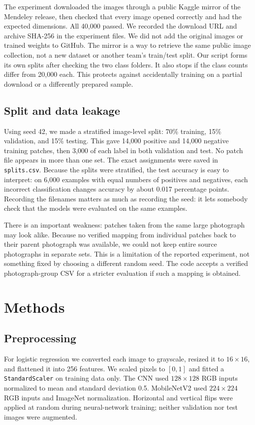 \documentclass[conference,letterpaper]{IEEEtran}
\begin{document}
The experiment downloaded the images through a public Kaggle mirror of the Mendeley release, then checked that every image opened correctly and had the expected dimensions. All 40,000 passed. We recorded the download URL and archive SHA-256 in the experiment files. We did not add the original images or trained weights to GitHub. The mirror is a way to retrieve the same public image collection, not a new dataset or another team's train/test split. Our script forms its own splits after checking the two class folders. It also stops if the class counts differ from 20,000 each. This protects against accidentally training on a partial download or a differently prepared sample.

\subsection{Split and data leakage}
Using seed 42, we made a stratified image-level split: 70\% training, 15\% validation, and 15\% testing. This gave 14,000 positive and 14,000 negative training patches, then 3,000 of each label in both validation and test. No patch file appears in more than one set. The exact assignments were saved in \texttt{splits.csv}. Because the splits were stratified, the test accuracy is easy to interpret: on 6,000 examples with equal numbers of positives and negatives, each incorrect classification changes accuracy by about 0.017 percentage points. Recording the filenames matters as much as recording the seed: it lets somebody check that the models were evaluated on the same examples.

There is an important weakness: patches taken from the same large photograph may look alike. Because no verified mapping from individual patches back to their parent photograph was available, we could not keep entire source photographs in separate sets. This is a limitation of the reported experiment, not something fixed by choosing a different random seed. The code accepts a verified photograph-group CSV for a stricter evaluation if such a mapping is obtained.

\section{Methods}
\subsection{Preprocessing}
For logistic regression we converted each image to grayscale, resized it to $16\times16$, and flattened it into 256 features. We scaled pixels to $[0,1]$ and fitted a \texttt{StandardScaler} on training data only. The CNN used $128\times128$ RGB inputs normalized to mean and standard deviation 0.5. MobileNetV2 used $224\times224$ RGB inputs and ImageNet normalization. Horizontal and vertical flips were applied at random during neural-network training; neither validation nor test images were augmented.
\end{document}
